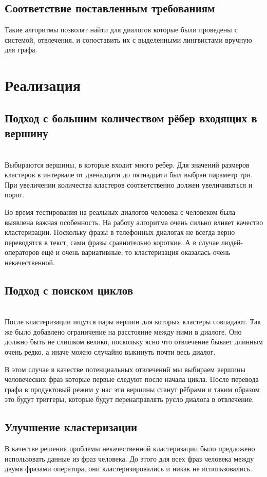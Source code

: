 \documentclass[specification,annotation]{itmo-student-thesis}
\begin{document}
	\section{Соответствие поставленным требованиям}
	Такие алгоритмы позволят найти для диалогов которые были проведены с системой, отвлечения, и сопоставить их с выделенными лингвистами вручную для графа.
	
	\chapter{Реализация}
	\section{Подход с большим количеством рёбер входящих в вершину}\\
	Выбираются вершины, в которые входит много ребер. Для значений размеров кластеров в интервале от двенадцати до пятнадцати был выбран параметр три. При увеличении количества кластеров соответственно должен увеличиваться и порог.
	
	Во время тестирования на реальных диалогов человека с человеком была выявлена важная особенность. На работу алгоритма очень сильно влияет качество кластеризации. Поскольку фразы в телефонных диалогах не всегда верно переводятся в текст, сами фразы сравнительно короткие. А в случае людей-операторов ещё и очень вариативные, то кластеризация оказалась очень некачественной.
	
	\section{Подход с поиском циклов}\\
	После кластеризации ищутся пары вершин для которых кластеры совпадают. Так же было добавлено ограничение на расстояние между ними в диалоге. Оно должно быть не слишком велико, поскольку ясно что отвлечение бывает длинным очень редко, а иначе можно случайно выкинуть почти весь диалог.
	
	В этом случае в качестве потенциальных отвлечений мы выбираем вершины человеческих фраз которые первые следуют после начала цикла. После перевода графа в продуктовый режим у нас эти вершины станут рёбрами и таким образом это будут триггеры, которые будут перенаправлять русло диалога в отвлечение.
	\section{Улучшение кластеризации}
	В качестве решения проблемы некачественной кластеризации было предложено использовать данные из фраз человека. До этого для всех фраз человека между двумя фразами оператора, они кластеризировались и никак не использовались. 
	
\end{document}

